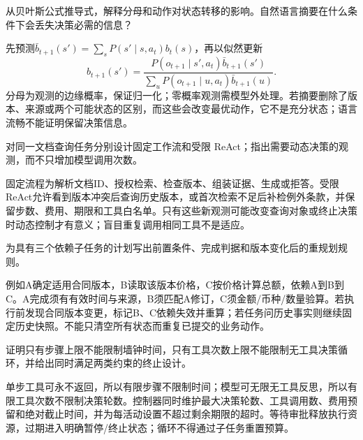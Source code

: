 
\begin{exercises}
\begin{exercise} 从贝叶斯公式推导式，解释分母和动作对状态转移的影响。自然语言摘要在什么条件下会丢失决策必需的信息？

\begin{solution}
先预测$\bar b_{t+1}(s')=\sum_sP(s'\mid s,a_t)b_t(s)$，再以似然更新
\[
 b_{t+1}(s')=\frac{P(o_{t+1}\mid s',a_t)\bar b_{t+1}(s')}{\sum_uP(o_{t+1}\mid u,a_t)\bar b_{t+1}(u)}.
\]
分母为观测的边缘概率，保证归一化；零概率观测需模型外处理。若摘要删除了版本、来源或两个可能状态的区别，而这些会改变最优动作，它不是充分状态；语言流畅不能证明保留决策信息。
\end{solution}
\end{exercise}

\begin{exercise} 对同一文档查询任务分别设计固定工作流和受限 ReAct；指出需要动态决策的观测，而不只增加模型调用次数。

\begin{solution}
固定流程为解析文档ID、授权检索、检查版本、组装证据、生成或拒答。受限ReAct允许看到版本冲突后查询历史版本，或首次检索不足后补检例外条款，并保留步数、费用、期限和工具白名单。只有这些新观测可能改变查询对象或终止决策时动态控制才有意义；盲目重复调用相同工具不是适应。
\end{solution}
\end{exercise}

\begin{exercise} 为具有三个依赖子任务的计划写出前置条件、完成判据和版本变化后的重规划规则。

\begin{solution}
例如A确定适用合同版本，B读取该版本价格，C按价格计算总额，依赖A到B到C。A完成须有有效时间与来源，B须匹配A修订，C须金额/币种/数量验算。若执行前发现合同版本变更，标记B、C依赖失效并重算；若任务问历史事实则继续固定历史快照。不能只清空所有状态而重复已提交的业务动作。
\end{solution}
\end{exercise}

\begin{exercise} 证明只有步骤上限不能限制墙钟时间，只有工具次数上限不能限制无工具决策循环，并给出同时满足两类约束的终止设计。

\begin{solution}
单步工具可永不返回，所以有限步骤不限制时间；模型可无限无工具反思，所以有限工具次数不限制决策轮数。控制器同时维护最大决策轮数、工具调用数、费用预留和绝对截止时间，并为每活动设置不超过剩余期限的超时。等待审批释放执行资源，过期进入明确暂停/终止状态；循环不得通过子任务重置预算。
\end{solution}
\end{exercise}


\end{exercises}
